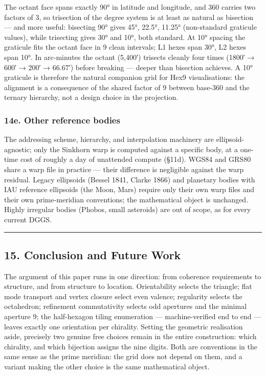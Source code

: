 \documentclass[
  11pt,
  a4paper,
]{article}
\begin{document}
The octant face spans exactly 90° in latitude and longitude, and 360
carries two factors of 3, so trisection of the degree system is at least
as natural as bisection --- and more useful: bisecting 90° gives 45°,
22.5°, 11.25° (non-standard graticule values), while trisecting gives
30° and 10°, both standard. At 10° spacing the graticule fits the octant
face in 9 clean intervals; L1 hexes span 30°, L2 hexes span 10°. In
arc-minutes the octant (5,400′) trisects cleanly four times (1800′ →
600′ → 200′ → 66.67′) before breaking --- deeper than bisection
achieves. A 10° graticule is therefore the natural companion grid for
Hex9 visualisations: the alignment is a consequence of the shared factor
of 9 between base-360 and the ternary hierarchy, not a design choice in
the projection.

\subsubsection{14e. Other reference
bodies}\label{e.-other-reference-bodies}

The addressing scheme, hierarchy, and interpolation machinery are
ellipsoid-agnostic; only the Sinkhorn warp is computed against a
specific body, at a one-time cost of roughly a day of unattended compute
(§11d). WGS84 and GRS80 share a warp file in practice --- their
difference is negligible against the warp residual. Legacy ellipsoids
(Bessel 1841, Clarke 1866) and planetary bodies with IAU reference
ellipsoids (the Moon, Mars) require only their own warp files and their
own prime-meridian conventions; the mathematical object is unchanged.
Highly irregular bodies (Phobos, small asteroids) are out of scope, as
for every current DGGS.

\begin{center}\rule{0.5\linewidth}{0.5pt}\end{center}

\subsection{15. Conclusion and Future
Work}\label{conclusion-and-future-work}

The argument of this paper runs in one direction: from coherence
requirements to structure, and from structure to location. Orientability
selects the triangle; flat mode transport and vertex closure select even
valence; regularity selects the octahedron; refinement commutativity
selects odd apertures and the minimal aperture 9; the half-hexagon
tiling enumeration --- machine-verified end to end --- leaves exactly
one orientation per chirality. Setting the geometric realisation aside,
precisely two genuine free choices remain in the entire construction:
which chirality, and which bijection assigns the nine digits. Both are
conventions in the same sense as the prime meridian: the grid does not
depend on them, and a variant making the other choice is the same
mathematical object.
\end{document}
